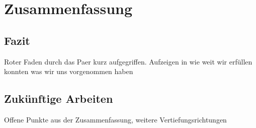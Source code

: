 \chapter{Zusammenfassung}
\label{conclusion}

\section{Fazit}

Roter Faden durch das Paer kurz aufgegriffen. Aufzeigen in wie weit wir erfüllen konnten was wir uns vorgenommen haben

\section{Zukünftige Arbeiten}
\label{sec:futurework}

Offene Punkte aus der Zusammenfassung, weitere Vertiefungsrichtungen